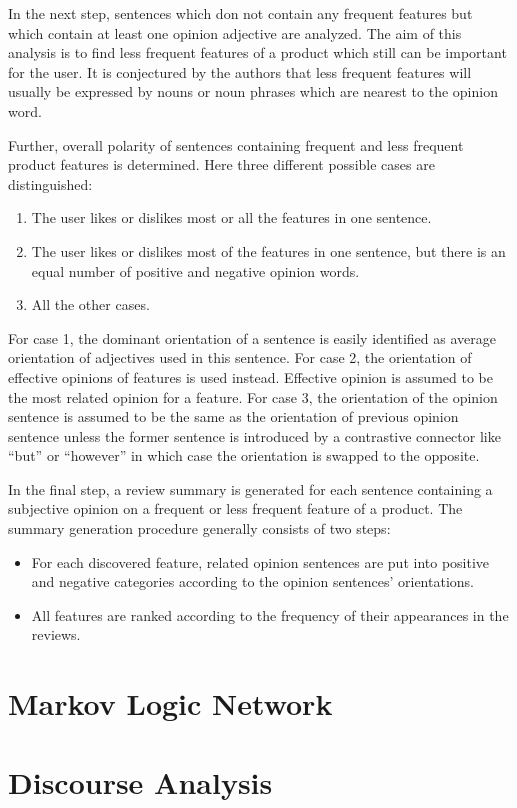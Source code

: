 \documentclass[a4paper,11pt]{article}
\begin{document}
In the next step, sentences which don not contain any frequent features but
which contain at least one opinion adjective are analyzed.  The aim of this
analysis is to find less frequent features of a product which still can be
important for the user.  It is conjectured by the authors that less frequent
features will usually be expressed by nouns or noun phrases which are nearest
to the opinion word.

Further, overall polarity of sentences containing frequent and less frequent
product features is determined.  Here three different possible cases are
distinguished:
\begin{enumerate}
  \item The user likes or dislikes most or all the features in one sentence.
  \item The user likes or dislikes most of the features in one sentence, but
    there is an equal number of positive and negative opinion words.
  \item All the other cases.
\end{enumerate}
For case 1, the dominant orientation of a sentence is easily identified as
average orientation of adjectives used in this sentence.  For case 2, the
orientation of effective opinions of features is used instead.  Effective
opinion is assumed to be the most related opinion for a feature.  For case 3,
the orientation of the opinion sentence is assumed to be the same as the
orientation of previous opinion sentence unless the former sentence is
introduced by a contrastive connector like ``but'' or ``however'' in which
case the orientation is swapped to the opposite.

In the final step, a review summary is generated for each sentence containing
a subjective opinion on a frequent or less frequent feature of a product.  The
summary generation procedure generally consists of two steps:
\begin{itemize}
  \item For each discovered feature, related opinion sentences are put into
    positive and negative categories according to the opinion sentences'
    orientations.

  \item All features are ranked according to the frequency of their
    appearances in the reviews.
\end{itemize}

\section{Markov Logic Network}

\section{Discourse Analysis}

\nocite{*}

\end{document}
